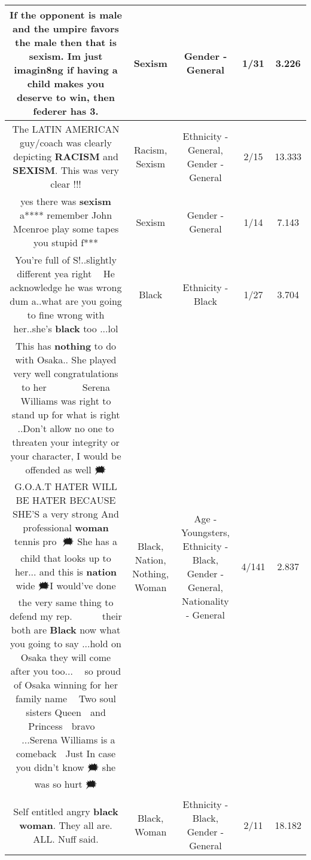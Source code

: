\documentclass[11pt]{article}
\newlength\mylength
\begin{document}
\begin{center}
\begin{longtable}{|C{.65\mylength}|C{.30\mylength}|C{.12\mylength}|C{.12\mylength}|C{.12\mylength}|}
  \small If the opponent is male and the umpire favors the male then that is \textbf{sexism}. Im just imagin8ng if having a child makes you deserve to win, then federer has 3.\normalsize   & Sexism & Gender - General & 1/31 & 3.226 \\  \hline
  \small The LATIN AMERICAN guy/coach was clearly depicting \textbf{RACISM} and \textbf{SEXISM}.  This was very clear !!!\normalsize   & Racism, Sexism & Ethnicity - General, Gender - General & 2/15 & 13.333 \\  \hline
  \small yes there was \textbf{sexism} a**** remember John Mcenroe play some tapes you stupid f***\normalsize   & Sexism & Gender - General & 1/14 & 7.143 \\  \hline
  \small You're full of S\@\@\@ !..slightly different yea right 🤦‍♀️ He acknowledge he was wrong dum a\@\@..what are you going to fine wrong with her..she's \textbf{black} too ...lol\normalsize   & Black & Ethnicity - Black & 1/27 & 3.704 \\  \hline
  \small This has \textbf{nothing} to do with Osaka.. She played very well congratulations to her 👏🏼👏🏼🎉🎉🎉👏🏼👏🏼 Serena Williams was right to stand up for what is right ..Don't allow no one to threaten your integrity or your character, I would be offended as well 🗯G.O.A.T HATER WILL BE HATER BECAUSE SHE'S a very strong And professional \textbf{woman} tennis pro 👑🗯 She has a child that looks up to her... and this is \textbf{nation} wide 🗯I would've done the very same thing to defend my rep.👏🏼👏🏼👏🏼👏🏼👏🏼 their both are \textbf{Black} now what you going to say ...hold on Osaka they will come after you too... 👑👸 so proud of Osaka winning for her family name 👏🏼 Two soul sisters Queen 👑 and Princess 👸 bravo 👏🏼👏🏼...Serena Williams is a comeback 👑 Just In case you didn't know 🗯 she was so hurt 🗯\normalsize   & Black, Nation, Nothing, Woman & Age - Youngsters, Ethnicity - Black, Gender - General, Nationality - General & 4/141 & 2.837 \\  \hline
  \small Self entitled angry \textbf{black} \textbf{woman}. They all are. ALL.  Nuff said.\normalsize   & Black, Woman & Ethnicity - Black, Gender - General & 2/11 & 18.182 \\  \hline

\end{longtable}
\end{center}
\end{document}
